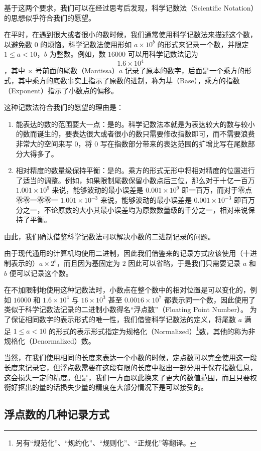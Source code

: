         基于这两个要求，我们可以在经过思考后发现，科学记数法（Scientific Notation）的思想似乎符合我们的愿望。

        在平时，在遇到很大或者很小的数时候，我们通常使用科学记数法来描述这个数，以避免数 $0$ 的烦恼。科学记数法使用形如 $a \times 10^b$ 的形式来记录一个数，并限定 $1 \leqslant a < 10 $，$b$ 为整数。例如，数 $16000$ 可以用科学记数法记为
        \[1.6 \times 10^4\]
        ，其中 $\times$ 号前面的尾数（Mantissa）$a$ 记录了原本的数字，后面是一个乘方的形式，其中乘方的底数事实上指示了原数的进制，称为基（Base），乘方的指数（Exponent）指示了小数点的偏移。

        这种记数法符合我们的愿望的理由是：
        \begin{enumerate}
            \item 能表达的数的范围要大一点：是的。科学记数法本就是为表达较大的数与较小的数而诞生的，要表达很大或者很小的数只需要修改指数即可，而不需要浪费非常大的空间来写 $0$，将 $0$ 写在指数部分带来的表达范围的扩增比写在尾数部分大得多了。
            \item 相对精度的数量级保持平衡：是的。乘方的形式无形中将相对精度的位置进行了适当的调整。例如，如果限制尾数保留小数点后三位，那么对于十亿一百万 $1.001 \times 10^9$ 来说，能够波动的最小误差是 $0.001 \times 10^9$ 即一百万，而对于零点零零一零零一 $1.001 \times 10^{-3}$ 来说，能够波动的最小误差是 $0.001 \times 10^{-3}$ 即百万分之一，不论原数的大小其最小误差均为原数数量级的千分之一，相对来说保持了平衡。
        \end{enumerate}

        由此，我们确认借鉴科学记数法可以解决小数的二进制记录的问题。

        由于现代通用的计算机均使用二进制，因此我们借鉴来的记录方式应该使用（十进制表示的）$a \times 2^b$，而且因为基固定为 $2$ 因此可以省略，于是我们只需要记录 $a$ 和 $b$ 便可以记录这个数。

        在不加限制地使用这种记数法时，小数点在整个数中的相对位置是可以变化的，例如 $16000$ 和 $1.6 \times 10^4$ 与 $16 \times 10^3$ 甚至 $0.0016 \times 10^7$ 都表示同一个数，因此使用了类似于科学记数法记录的二进制小数得名“浮点数”（Floating Point Number）。
        为了保证相同数字的表示形式的唯一性，我们借鉴科学记数法的定义，将尾数 $a$ 满足 $1 \leqslant a < 10$ 的形式的表示形式指定为规格化（Normalized）\footnote{另有“规范化”、“规约化”、“规则化”、“正规化”等翻译。}数，其他的称为非规格化（Denormalized）数。

        当然，在我们使用相同的长度来表达一个小数的时候，定点数可以完全使用这一段长度来记录它，但浮点数需要在这段有限的长度中抠出一部分用于保存指数信息，这会损失一定的精度。但是，我们一方面以此换来了更大的数值范围，而且只要权衡好抠出的量的话损失少量的精度在大部分情况下是可以接受的。

    \subsection{浮点数的几种记录方式}\label{subsec:NumberSystemBasics/FixedPointAndFloatingPoint/FloatingPointNotations}

